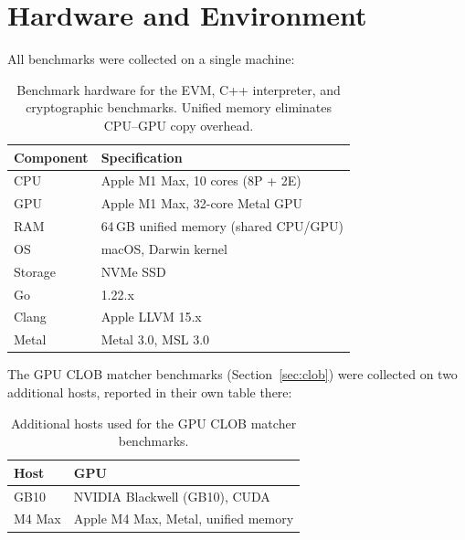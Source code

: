 \section{Hardware and Environment}


All benchmarks were collected on a single machine:

\begin{table}[h]
\centering
\small
\begin{tabular}{ll}
\toprule
\textbf{Component} & \textbf{Specification} \\
\midrule
CPU   & Apple M1 Max, 10 cores (8P + 2E) \\
GPU   & Apple M1 Max, 32-core Metal GPU \\
RAM   & 64\,GB unified memory (shared CPU/GPU) \\
OS    & macOS, Darwin kernel \\
Storage & NVMe SSD \\
Go    & 1.22.x \\
Clang & Apple LLVM 15.x \\
Metal & Metal 3.0, MSL 3.0 \\
\bottomrule
\end{tabular}
\caption{Benchmark hardware for the EVM, C++ interpreter, and
cryptographic benchmarks. Unified memory eliminates CPU--GPU copy
overhead.}
\label{tab:hardware}
\end{table}

The GPU CLOB matcher benchmarks (Section~\ref{sec:clob}) were collected
on two additional hosts, reported in their own table there:

\begin{table}[h]
\centering
\small
\begin{tabular}{ll}
\toprule
\textbf{Host} & \textbf{GPU} \\
\midrule
GB10    & NVIDIA Blackwell (GB10), CUDA \\
M4 Max  & Apple M4 Max, Metal, unified memory \\
\bottomrule
\end{tabular}
\caption{Additional hosts used for the GPU CLOB matcher benchmarks.}
\label{tab:hardware-clob}
\end{table}

